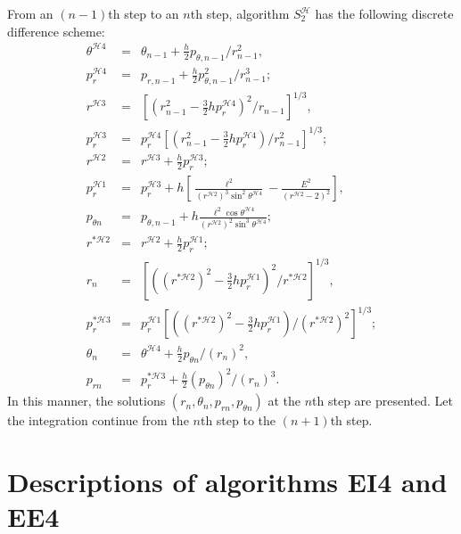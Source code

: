 \documentclass[preprint2]{aastex}
\begin{document}
From an $(n-1)$th step to an $n$th step, algorithm
$S^{\mathcal{H}}_2$ has the following discrete difference scheme:
\begin{eqnarray}
\theta^{\mathcal{H}4} &=& \theta_{n-1}+\frac{h}{2} p_{\theta, n-1}/r^{2}_{n-1}, \nonumber \\
 p^{\mathcal{H}4}_r &=& p_{r,n-1}+\frac{h}{2} p^2_{\theta,n-1}/r^{3}_{n-1}; \nonumber \\
r^{\mathcal{H}3} &=& [(r^{2}_{n-1}-\frac{3}{2}h p^{\mathcal{H}4}_r)^{2}/r_{n-1}]^{1/3}, \nonumber \\
 p^{\mathcal{H}3}_r &=& p^{\mathcal{H}4}_r[(r^{2}_{n-1}-\frac{3}{2}h
p^{\mathcal{H}4}_r)/r^2_{n-1}]^{1/3}; \nonumber \\
r^{\mathcal{H}2} &=& r^{\mathcal{H}3}+\frac{h}{2} p^{\mathcal{H}3}_r; \nonumber \\
p^{\mathcal{H}1}_{r} &=& p^{\mathcal{H}3}_r +h
[\frac{\ell^{2}}{(r^{\mathcal{H}2})^3\sin^2\theta^{\mathcal{H}4}}-\frac{E^{2}}{(r^{\mathcal{H}2}-2)^{2}}], \nonumber \\
p_{\theta n} &=& p_{\theta,n-1}+h
\frac{\ell^2\cos\theta^{\mathcal{H}4}}
{(r^{\mathcal{H}2})^2\sin^{3}\theta^{\mathcal{H}4}}; \nonumber \\
r^{*\mathcal{H}2} &=& r^{\mathcal{H}2}+\frac{h}{2} p^{\mathcal{H}1}_r; \nonumber \\
r_{n} &=& [((r^{*\mathcal{H}2})^2-\frac{3}{2}h p^{\mathcal{H}1}_r)^{2}/r^{*\mathcal{H}2}]^{1/3}, \nonumber \\
p^{*\mathcal{H}3}_r &=&
p^{\mathcal{H}1}_r[((r^{*\mathcal{H}2})^{2}-\frac{3}{2}h
p^{\mathcal{H}1}_r)/(r^{*\mathcal{H}2})^2]^{1/3}; \nonumber \\
\theta_{n} &=& \theta^{\mathcal{H}4}+\frac{h}{2} p_{\theta n}/(r_n)^2, \nonumber \\
 p_{rn} &=& p^{*\mathcal{H}3}_{r}+\frac{h}{2} (p_{\theta n})^2/(r_n)^3. \nonumber
\end{eqnarray}
In this manner, the solutions $(r_{n}, \theta_{n},  p_{rn},
p_{\theta n})$ at the $n$th step are presented. Let the
integration continue from the $n$th step to the  $(n+1)$th step.


\section{Descriptions of algorithms EI4 and EE4}
\end{document}
